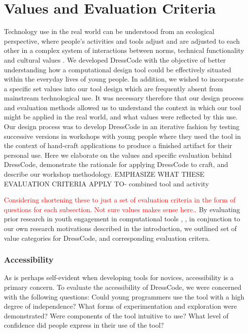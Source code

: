 \documentclass{sigchi}
\begin{document}
\section{Values and Evaluation Criteria}
 Technology use in the real world can be understood from an ecological perspective, where people's activities and tools adjust and are adjusted to each other in a complex system of interactions between norms, technical functionality and cultural values \cite{information_ecologies}. We developed DressCode with the objective of better understanding how a computational design tool could be effectively situated within the everyday lives of young people. In addition, we wished to incorporate a specific set values into our tool design which are frequently absent from mainstream technological use. It was necessary therefore that our design process and evaluation methods allowed us to understand the context in which our tool might be applied in the real world, and what values were reflected by this use. Our design process was to develop DressCode in an iterative fashion by testing successive versions in workshops with young people where they used the tool in the context of hand-craft applications to produce a finished artifact for their personal use. Here we elaborate on the values and specific evaluation behind DressCode, demonstrate the rationale for applying DressCode to craft, and describe our workshop methodology. EMPHASIZE WHAT THESE EVALUATION CRITERIA APPLY TO- combined tool and activity

\textcolor{red}{Considering shortening these to just a set of evaluation criteria in the form of questions for each subsection. Not sure values makes sense here..}
By evaluating prior research in youth engagement in computational tools \cite{computational_thinking}, \cite{introductory_programming}, in conjunction to our own research motivations described in the introduction, we outlined set of value categories for DressCode, and corresponding evaluation critera.

\subsubsection{Accessibility}
 As is perhaps self-evident when developing tools for novices, accessibility is a primary concern. To evaluate the accessibility of DressCode, we were concerned with the following questions: Could young programmers use the tool with a high degree of independence? What forms of experimentation and exploration were demonstrated? Were components of the tool intuitive to use? What level of confidence did people express in their use of the tool?
\end{document}
